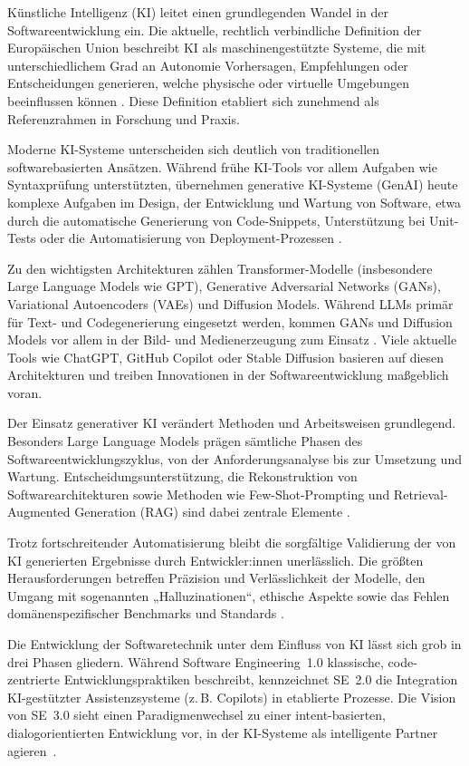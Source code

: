 
Künstliche Intelligenz (KI) leitet einen grundlegenden Wandel in der
Softwareentwicklung ein. Die aktuelle, rechtlich verbindliche Definition der
Europäischen Union beschreibt KI als maschinengestützte Systeme, die mit
unterschiedlichem Grad an Autonomie Vorhersagen, Empfehlungen oder
Entscheidungen generieren, welche physische oder virtuelle Umgebungen
beeinflussen können \cite{noauthor_verordnung_nodate}. Diese Definition
etabliert sich zunehmend als Referenzrahmen in Forschung und Praxis.

Moderne KI-Systeme unterscheiden sich deutlich von traditionellen
softwarebasierten Ansätzen. Während frühe KI-Tools vor allem Aufgaben wie
Syntaxprüfung unterstützten, übernehmen generative KI-Systeme (GenAI) heute
komplexe Aufgaben im Design, der Entwicklung und Wartung von Software, etwa
durch die automatische Generierung von Code-Snippets, Unterstützung bei
Unit-Tests oder die Automatisierung von Deployment-Prozessen
\cite{donvir_role_2024}.

Zu den wichtigsten Architekturen zählen Transformer-Modelle (insbesondere Large
Language Models wie GPT), Generative Adversarial Networks (GANs), Variational
Autoencoders (VAEs) und Diffusion Models. Während LLMs primär für Text- und
Codegenerierung eingesetzt werden, kommen GANs und Diffusion Models vor allem
in der Bild- und Medienerzeugung zum Einsatz \cite{donvir_role_2024}. Viele
aktuelle Tools wie ChatGPT, GitHub Copilot oder Stable Diffusion basieren auf
diesen Architekturen und treiben Innovationen in der Softwareentwicklung
maßgeblich voran.

Der Einsatz generativer KI verändert Methoden und Arbeitsweisen grundlegend.
Besonders Large Language Models prägen sämtliche Phasen des
Softwareentwicklungszyklus, von der Anforderungsanalyse bis zur Umsetzung und
Wartung. Entscheidungsunterstützung, die Rekonstruktion von
Softwarearchitekturen sowie Methoden wie Few-Shot-Prompting und
Retrieval-Augmented Generation (RAG) sind dabei zentrale Elemente
\cite{esposito_generative_2025}.

Trotz fortschreitender Automatisierung bleibt die sorgfältige Validierung der
von KI generierten Ergebnisse durch Entwickler:innen unerlässlich. Die größten
Herausforderungen betreffen Präzision und Verlässlichkeit der Modelle, den
Umgang mit sogenannten „Halluzinationen“, ethische Aspekte sowie das Fehlen
domänenspezifischer Benchmarks und Standards \cite{esposito_generative_2025}.

Die Entwicklung der Softwaretechnik unter dem Einfluss von KI lässt sich grob
in drei Phasen gliedern. Während Software Engineering~1.0 klassische,
code-zentrierte Entwicklungspraktiken beschreibt, kennzeichnet SE~2.0 die
Integration KI-gestützter Assistenzsysteme (z.\,B. Copilots) in etablierte
Prozesse. Die Vision von SE~3.0 sieht einen Paradigmenwechsel zu einer
intent-basierten, dialogorientierten Entwicklung vor, in der KI-Systeme als
intelligente Partner agieren~\cite{hassan_towards_2024}.

